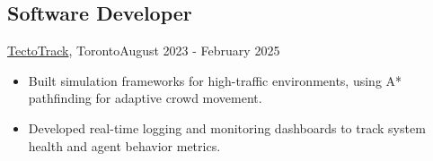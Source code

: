 \subsection{Software Developer}{\href{https://www.tectotrack.com/}{TectoTrack}, Toronto}{August 2023 - February 2025}
\begin{itemize}
    \item Built simulation frameworks for high-traffic environments, using A* pathfinding for adaptive crowd movement.
    \item Developed real-time logging and monitoring dashboards to track system health and agent behavior metrics.
\end{itemize}
